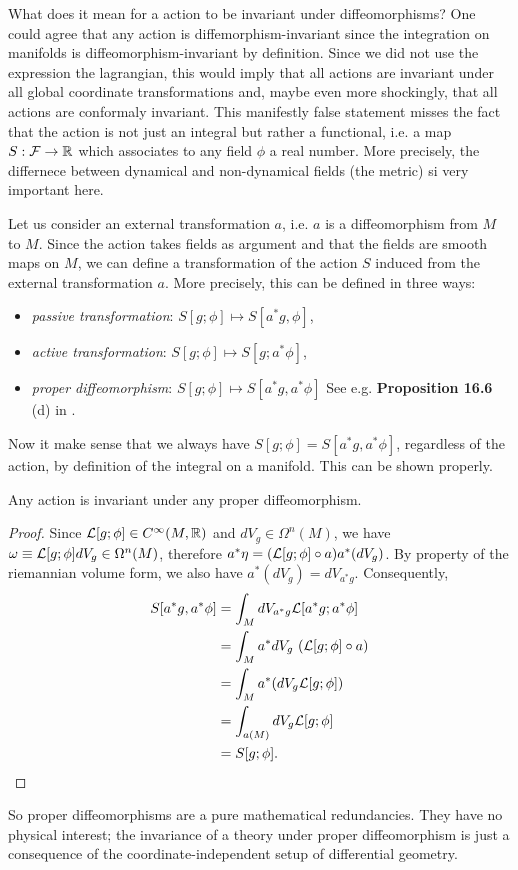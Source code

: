 \documentclass[a4paper,10pt]{article}
\begin{document}
        What does it mean for a action to be invariant under diffeomorphisms? One could agree that any action is diffemorphism-invariant since the integration on manifolds is diffeomorphism-invariant by definition. Since we did not use the expression the lagrangian, this would imply that all actions are invariant under all global coordinate transformations and, maybe even more shockingly, that all actions are conformaly invariant. This manifestly false statement misses the fact that the action is not just an integral but rather a functional, i.e. a map $S:\mathcal{F}\to\mathbb{R}$ which associates to any field $\phi$ a real number. More precisely, the differnece between dynamical and non-dynamical fields (the metric) si very important here.

        Let us consider an external transformation $a$, i.e. $a$ is a diffeomorphism from $M$ to $M$. Since the action takes fields as argument and that the fields are smooth maps on $M$, we can define a transformation of the action $S$ induced from the external transformation $a$. More precisely, this can be defined in three ways:
        \begin{itemize}
            \item \emph{passive transformation}: $S[g;\phi]\mapsto S[a^*g,\phi]$,
            \item \emph{active transformation}: $S[g;\phi]\mapsto S[g;a^*\phi]$,
            \item \emph{proper diffeomorphism}: $S[g;\phi]\mapsto S[a^*g,a^*\phi]$  See e.g. \textbf{Proposition 16.6} (d) in \cite{Lee_2012}.
        \end{itemize}
        Now it make sense that we always have $S[g;\phi]=S[a^*g,a^*\phi]$, regardless of the action, by definition of the integral on a manifold. This can be shown properly.
        \begin{prop}
            Any action is invariant under any proper diffeomorphism.
        \end{prop}
        \begin{proof}
            Since $\mathcal{L}[g;\phi]\in C^\infty(M,\mathbb{R})$ and $dV_g\in\Omega^n(M)$, we have $\omega\equiv\mathcal{L}[g;\phi]dV_g\in\Omega^n(M)$, therefore $a^*\eta=(\mathcal{L}[g;\phi]\circ a) a^*(dV_g)$. By property of the riemannian volume form, we also have $a^*(dV_g)=dV_{a^*g}$. Consequently,
            \begin{align}
                S[a^*g,a^*\phi] &= \int_M dV_{a^*g}\mathcal{L}[a^*g;a^*\phi] \\
                &\stackrel{\label{eq:lagcdt}}{=} \int_M a^*dV_g~(\mathcal{L}[g;\phi]\circ a) \\
                &= \int_M a^*(dV_g\mathcal{L}[g;\phi]) \\
                &= \int_{a(M)} dV_g\mathcal{L}[g;\phi] \\
                &= S[g;\phi].
            \end{align}
        \end{proof}
        So proper diffeomorphisms are a pure mathematical redundancies. They have no physical interest; the invariance of a theory under proper diffeomorphism is just a consequence of the coordinate-independent setup of differential geometry.
\end{document}
